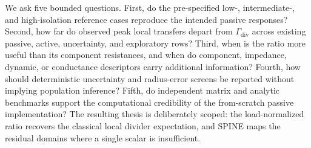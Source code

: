 We ask five bounded questions. First, do the pre-specified low-, intermediate-, and high-isolation reference cases reproduce the intended passive responses? Second, how far do observed peak local transfers depart from $\Gamma_{\mathrm{div}}$ across existing passive, active, uncertainty, and exploratory rows? Third, when is the ratio more useful than its component resistances, and when do component, impedance, dynamic, or conductance descriptors carry additional information? Fourth, how should deterministic uncertainty and radius-error screens be reported without implying population inference? Fifth, do independent matrix and analytic benchmarks support the computational credibility of the from-scratch passive implementation? The resulting thesis is deliberately scoped: the load-normalized ratio recovers the classical local divider expectation, and SPINE maps the residual domains where a single scalar is insufficient.
